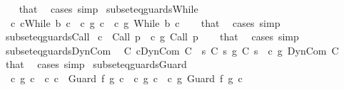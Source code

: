 \begin{isabellebody}
%
\isadelimproof
\ \ %
\endisadelimproof
%
\isatagproof
{}\isamarkupfalse%
\ that\ \isamarkupfalse%
\ cases\ simp%
\endisatagproof
{\isafoldproof}%
%
\isadelimproof
\isanewline
%
\endisadelimproof
\isanewline
{}\isamarkupfalse%
\ subseteq{\isacharunderscore}guards{\isacharunderscore}While{\isacharcolon}\isanewline
\ \ {\isachardoublequoteopen}{\isasymexists}c{\isacharprime}{\isacharprime}{\isachardot}\ c{\isacharequal}While\ b\ c{\isacharprime}{\isacharprime}\ {\isasymand}\ {\isacharparenleft}c{\isacharprime}{\isacharprime}\ {\isasymsubseteq}\isactrlsub g\ c{\isacharprime}{\isacharparenright}{\isachardoublequoteclose}\ \ {\isachardoublequoteopen}c\ {\isasymsubseteq}\isactrlsub g\ While\ b\ c{\isacharprime}{\isachardoublequoteclose}\isanewline
%
\isadelimproof
\ \ %
\endisadelimproof
%
\isatagproof
{}\isamarkupfalse%
\ that\ \isamarkupfalse%
\ cases\ simp%
\endisatagproof
{\isafoldproof}%
%
\isadelimproof
\isanewline
%
\endisadelimproof
\isanewline
{}\isamarkupfalse%
\ subseteq{\isacharunderscore}guards{\isacharunderscore}Call{\isacharcolon}\isanewline
\ {\isachardoublequoteopen}c\ {\isacharequal}\ Call\ p{\isachardoublequoteclose}\ \ {\isachardoublequoteopen}c\ {\isasymsubseteq}\isactrlsub g\ Call\ p{\isachardoublequoteclose}\isanewline
%
\isadelimproof
\ \ %
\endisadelimproof
%
\isatagproof
{}\isamarkupfalse%
\ that\ \isamarkupfalse%
\ cases\ simp%
\endisatagproof
{\isafoldproof}%
%
\isadelimproof
\isanewline
%
\endisadelimproof
\isanewline
{}\isamarkupfalse%
\ subseteq{\isacharunderscore}guards{\isacharunderscore}DynCom{\isacharcolon}\isanewline
\ \ {\isachardoublequoteopen}{\isasymexists}C{\isacharprime}{\isachardot}\ c{\isacharequal}DynCom\ C{\isacharprime}\ {\isasymand}\ {\isacharparenleft}{\isasymforall}s{\isachardot}\ C{\isacharprime}\ s\ {\isasymsubseteq}\isactrlsub g\ C\ s{\isacharparenright}{\isachardoublequoteclose}\ \ {\isachardoublequoteopen}c\ {\isasymsubseteq}\isactrlsub g\ DynCom\ C{\isachardoublequoteclose}\isanewline
%
\isadelimproof
\ \ %
\endisadelimproof
%
\isatagproof
{}\isamarkupfalse%
\ that\ \isamarkupfalse%
\ cases\ simp%
\endisatagproof
{\isafoldproof}%
%
\isadelimproof
\isanewline
%
\endisadelimproof
\isanewline
{}\isamarkupfalse%
\ subseteq{\isacharunderscore}guards{\isacharunderscore}Guard{\isacharcolon}\isanewline
\ \ {\isachardoublequoteopen}{\isacharparenleft}c\ {\isasymsubseteq}\isactrlsub g\ c{\isacharprime}{\isacharparenright}\ {\isasymor}\ {\isacharparenleft}{\isasymexists}c{\isacharprime}{\isacharprime}{\isachardot}\ c\ {\isacharequal}\ Guard\ f\ g\ c{\isacharprime}{\isacharprime}\ {\isasymand}\ {\isacharparenleft}c{\isacharprime}{\isacharprime}\ {\isasymsubseteq}\isactrlsub g\ c{\isacharprime}{\isacharparenright}{\isacharparenright}{\isachardoublequoteclose}\ \ {\isachardoublequoteopen}c\ {\isasymsubseteq}\isactrlsub g\ Guard\ f\ g\ c{\isacharprime}{\isachardoublequoteclose}\isanewline

\end{isabellebody}

